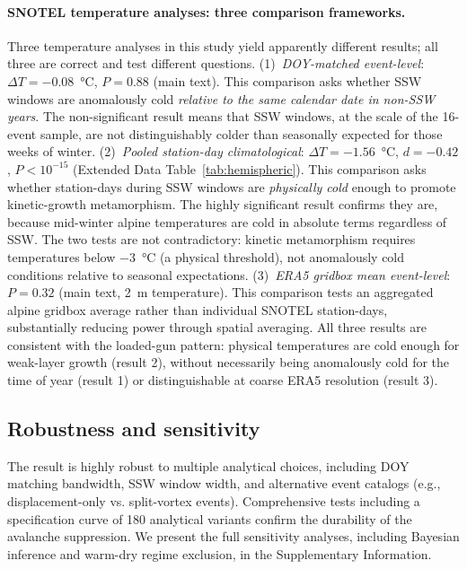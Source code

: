 \documentclass[11pt,letterpaper]{article}
\begin{document}
\paragraph{SNOTEL temperature analyses: three comparison frameworks.} Three temperature analyses in this study yield apparently different results; all three are correct and test different questions. (1)~\emph{DOY-matched event-level}: $\Delta T = -0.08$~°C, $P = 0.88$ (main text). This comparison asks whether SSW windows are anomalously cold \emph{relative to the same calendar date in non-SSW years}. The non-significant result means that SSW windows, at the scale of the 16-event sample, are not distinguishably colder than seasonally expected for those weeks of winter. (2)~\emph{Pooled station-day climatological}: $\Delta T = -1.56$~°C, $d = -0.42$, $P < 10^{-15}$ (Extended Data Table~\ref{tab:hemispheric}). This comparison asks whether station-days during SSW windows are \emph{physically cold} enough to promote kinetic-growth metamorphism. The highly significant result confirms they are, because mid-winter alpine temperatures are cold in absolute terms regardless of SSW. The two tests are not contradictory: kinetic metamorphism requires temperatures below $-3$~°C (a physical threshold), not anomalously cold conditions relative to seasonal expectations. (3)~\emph{ERA5 gridbox mean event-level}: $P = 0.32$ (main text, 2~m temperature). This comparison tests an aggregated alpine gridbox average rather than individual SNOTEL station-days, substantially reducing power through spatial averaging. All three results are consistent with the loaded-gun pattern: physical temperatures are cold enough for weak-layer growth (result 2), without necessarily being anomalously cold for the time of year (result 1) or distinguishable at coarse ERA5 resolution (result 3).

\subsection*{Robustness and sensitivity}

The result is highly robust to multiple analytical choices, including DOY matching bandwidth, SSW window width, and alternative event catalogs (e.g., displacement-only vs. split-vortex events). Comprehensive tests including a specification curve of 180 analytical variants confirm the durability of the avalanche suppression. We present the full sensitivity analyses, including Bayesian inference and warm-dry regime exclusion, in the Supplementary Information.
\end{document}
